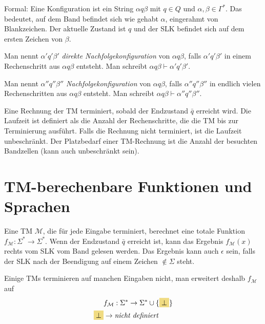 \documentclass{scrartcl}%
\begin{document}
    \vspace*{0.3cm}
    Formal: Eine Konfiguration ist ein String $\alpha q\beta$ mit $q \in Q$ und $\alpha, \beta \in \Gamma^*$.
    Das bedeutet, auf dem Band befindet sich wie gehabt $\alpha$, eingerahmt von Blankzeichen.
    Der aktuelle Zustand ist $q$ und der SLK befindet sich auf dem ersten Zeichen von $\beta$.

    \vspace*{0.3cm}
    Man nennt $\alpha'q'\beta'$ \textit{direkte Nachfolgekonfiguration} von $\alpha q\beta$,
    falls $\alpha'q'\beta'$ in einem Rechenschritt aus $\alpha q\beta$ entsteht.
    Man schreibt
    $\alpha q\beta \vdash \alpha'q'\beta'$.

    Man nennt $\alpha''q''\beta''$ \textit{Nachfolgekonfiguration} von $\alpha q\beta$,
    falls $\alpha''q''\beta''$ in endlich vielen Rechenschritten aus $\alpha q\beta$ entsteht.
    Man schreibt
    $\alpha q\beta \vdash \alpha''q''\beta''$.

    \vspace*{0.3cm}
    Eine Rechnung der TM terminiert, sobald der Endzustand $\bar{q}$ erreicht wird.
    Die Laufzeit ist definiert als die Anzahl der Rechenschritte, die die TM bis zur Terminierung ausführt.
    Falls die Rechnung nicht terminiert, ist die Laufzeit unbeschränkt.
    Der Platzbedarf einer TM-Rechnung ist die Anzahl der besuchten Bandzellen (kann auch unbeschränkt sein).

    \section*{TM-berechenbare Funktionen und Sprachen}
    Eine TM $\mathcal{M}$, die für jede Eingabe terminiert, berechnet eine totale Funktion $f_\mathcal{M} : \Sigma^* \rightarrow \Sigma^*$.
    Wenn der Endzustand $\bar{q}$ erreicht ist, kann das Ergebnis $f_\mathcal{M}(x)$ rechts vom SLK vom Band gelesen werden.
    Das Ergebnis kann auch $\epsilon$ sein, falls der SLK nach der Beendigung auf einem Zeichen $\notin \Sigma$ steht.

    \vspace*{0.3cm}
    Einige TMs terminieren auf manchen Eingaben nicht, man erweitert deshalb $f_\mathcal{M}$ auf
    \begin{equation*}
        \begin{align}
            & f_\mathcal{M} : \Sigma^* \rightarrow \Sigma^* \cup \{  \colorbox{buff}{$\bot$} \} \\
            \colorbox{buff}{$\bot$} & \rightarrow \textit{nicht definiert}
        \end{align}
    \end{equation*}
\end{document}
